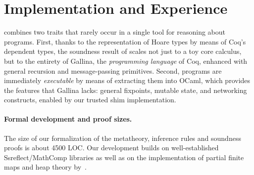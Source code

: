 



\section{Implementation and Experience}
\label{sec:eval-impl}

\disel combines two traits that rarely occur in a single tool for
reasoning about programs.  First, thanks to the representation of Hoare
types by means of Coq's dependent types, the soundness result of
\disel scales not just to a toy core calculus, but to the entirety of
Gallina, the \emph{programming language} of Coq, enhanced with general
recursion and message-passing primitives.
%
Second, \disel programs are immediately \emph{executable} by means of
extracting them into OCaml, which provides the features that Gallina
lacks: general fixpoints, mutable state, and networking constructs,
enabled by our trusted shim implementation.


\paragraph{Formal development and proof sizes.~}
%
The size of our formalization of the metatheory, inference rules and
soundness proofs is about 4500 LOC.  Our development builds on
well-established {Ssreflect}/MathComp libraries
\cite{Gonthier-al:TR,Maboubi-Tassi:MathComp,Sergey:PnP} as well as on
the implementation of partial finite maps and heap theory
by~\citet{Nanevski-al:POPL10}.

